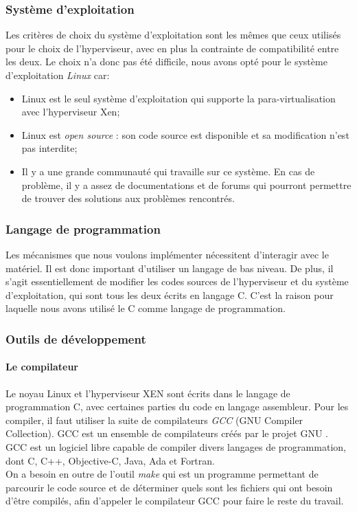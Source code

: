 \subsubsection{Système d'exploitation}
Les critères de choix du système d'exploitation sont les mêmes que ceux utilisés pour le choix de l'hyperviseur, avec en plus la contrainte de compatibilité entre les deux. Le choix n'a donc pas été difficile, nous avons opté pour le système d'exploitation \emph{Linux} car:
\begin{itemize}[label=]
    \item Linux est le seul système d'exploitation qui supporte la para-virtualisation avec l'hyperviseur Xen;
    \item Linux est \textit{open source} : son code source est disponible et sa modification n'est pas interdite;
    \item Il y a une grande communauté qui travaille sur ce système. En cas de problème, il y a assez de documentations et de forums qui pourront permettre de trouver des solutions aux problèmes rencontrés.
\end{itemize}

\subsubsection{Langage de programmation}
Les mécanismes que nous voulons implémenter nécessitent d'interagir avec le matériel. Il est  donc important d'utiliser un langage de bas niveau. De plus, il s'agit essentiellement de modifier les codes sources de l'hyperviseur et du système d'exploitation, qui sont tous les deux écrits en langage C. C'est la raison pour laquelle nous avons utilisé le C comme langage de programmation.

\subsubsection{Outils de développement}
\paragraph{\textbf{Le compilateur}}
\par\noindent
\par\noindent Le noyau Linux et l'hyperviseur XEN sont écrits dans le langage de programmation C, avec certaines parties du code en langage assembleur. Pour les compiler, il faut utiliser la suite de compilateurs \emph{GCC} (GNU Compiler Collection). GCC est un ensemble de compilateurs créés par le projet GNU \cite{gnu}. GCC est un logiciel libre capable de compiler divers langages de programmation, dont C, C++, Objective-C, Java, Ada et Fortran. \\
On a besoin en outre de l'outil \emph{make} qui est un programme permettant de parcourir le code source et de déterminer quels sont les fichiers qui ont besoin d'être compilés, afin d'appeler le compilateur GCC pour faire le reste du travail.

